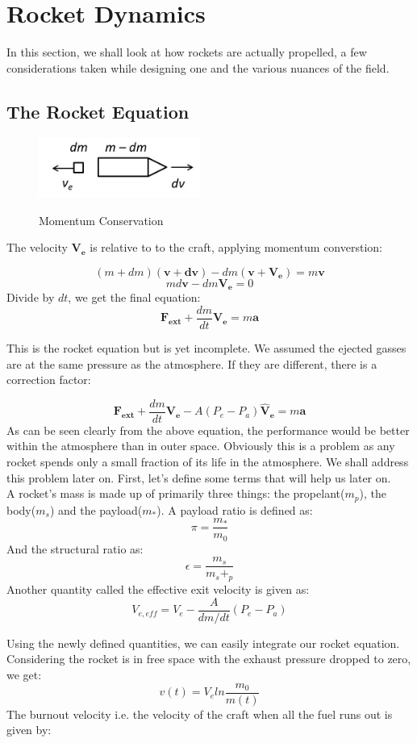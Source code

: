 \documentclass[12pt, letterpaper]{article}
\begin{document}
\newpage
\section{Rocket Dynamics}
In this section, we shall look at how rockets are actually propelled, a few considerations taken while designing one and the various nuances of the field. 
\subsection{The Rocket Equation}

\begin{figure}[ht]
	\centering
    \includegraphics[width = 200px]{rocket_thrust}
    \label{fig:rt}
    \caption{Momentum Conservation}
\end{figure}

The velocity $\mathbf{V_e}$ is relative to to the craft, applying momentum converstion:

\[
	(m + dm)(\mathbf{v} + \mathbf{dv}) -dm(\mathbf{v} + \mathbf{V_e}) = m\mathbf{v}
\]
\[
	md\mathbf{v} -dm\mathbf{V_e} = 0
\]
Divide by $dt$, we get the final equation:
\[
	\mathbf{F_{ext}} + \frac{dm}{dt}\mathbf{V_e} = m\mathbf{a}
\]

This is the rocket equation but is yet incomplete. We assumed the ejected gasses are at the same pressure as the atmosphere. If they are different, there is a correction factor:

\[
	\mathbf{F_{ext}} + \frac{dm}{dt}\mathbf{V_e} - A(P_e - P_a)\mathbf{\hat{V}_e} = m\mathbf{a}
\]
As can be seen clearly from the above equation, the performance would be better within the atmosphere than in outer space. Obviously this is a problem as any rocket spends only a small fraction of its life in the atmosphere. We shall address this problem later on. First, let's define some terms that will help us later on.\\
A rocket's mass is made up of primarily three things: the propelant($m_p$), the body($m_s$) and the payload($m_*$). A payload ratio is defined as:
\[
	\pi = \frac{m_*}{m_0}
\]
And the structural ratio as:
\[
	\epsilon = \frac{m_s}{m_s+_p}
\]
Another quantity called the effective exit velocity is given as:
\[
	V_{e,eff} = V_e - \frac{A}{dm/dt}(P_e - P_a)
\]

Using the newly defined quantities, we can easily integrate our rocket equation. Considering the rocket is in free space with the exhaust pressure dropped to zero, we get:
\[
	v(t) = V_eln\frac{m_0}{m(t)}
\]
The burnout velocity i.e. the velocity of the craft when all the fuel runs out is given by:
\end{document}
